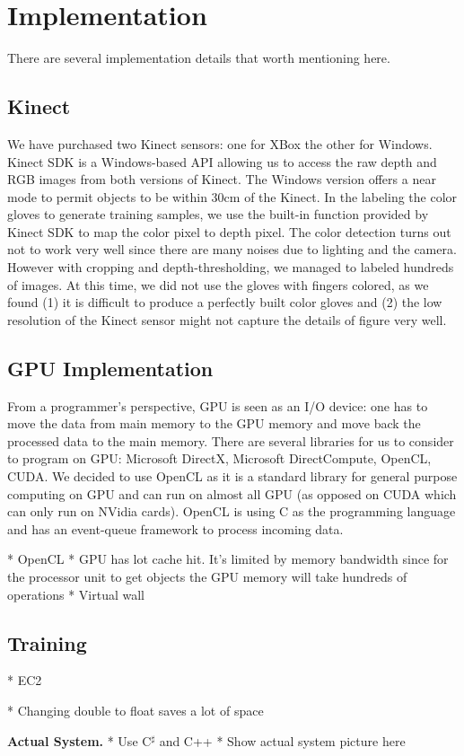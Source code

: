 \section{Implementation}

There are several implementation details that worth mentioning here. 

\subsection{Kinect}
We have purchased two Kinect sensors: one for XBox the other for Windows. Kinect SDK is a Windows-based API allowing us to access the raw depth and RGB images from both versions of Kinect. The Windows version offers a near mode to permit objects to be within 30cm of the Kinect. In the labeling the color gloves to generate training samples, we use the built-in function provided by Kinect SDK to map the color pixel to depth pixel. The color detection turns out not to work very well since there are many noises due to lighting and the camera. However with cropping and depth-thresholding, we managed to labeled hundreds of images. At this time, we did not use the gloves with fingers colored, as we found (1) it is difficult to produce a perfectly built color gloves and (2) the low resolution of the Kinect sensor might not capture the details of figure very well.

\subsection{GPU Implementation}
From a programmer's perspective, GPU is seen as an I/O device: one has to move the data from main memory to the GPU memory and move back the processed data to the main memory. There are several libraries for us to consider to program on GPU: Microsoft DirectX, Microsoft DirectCompute, OpenCL, CUDA. We decided to use OpenCL as it is a standard library for general purpose computing on GPU and can run on almost all GPU (as opposed on CUDA which can only run on NVidia cards). OpenCL is using C as the programming language and has an event-queue framework to process incoming data. 


* OpenCL
* GPU has lot cache hit. It's limited by memory bandwidth since for the processor unit to get objects the GPU memory will take hundreds of operations
* Virtual wall

\subsection{Training}
* EC2

* Changing double to float saves a lot of space


\textbf{Actual System.}
* Use C$^\sharp$ and C++
* Show actual system picture here

